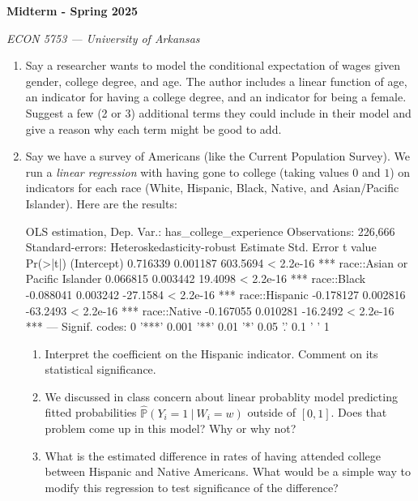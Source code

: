 \documentclass[12pt]{article}
\begin{document}
\begin{center}
  {\Huge\bf Midterm - Spring 2025}

  \smallskip
  {\large\it ECON 5753 — University of Arkansas}
\end{center}

\medskip
\begin{enumerate}
  \item Say a researcher wants to model the conditional expectation of wages given gender, college degree, and age. The author includes a linear function of age, an indicator for having a college degree, and an indicator for being a female. Suggest a few (2 or 3) additional terms they could include in their model and give a reason why each term might be good to add.

  \bigskip
  \item Say we have a survey of Americans (like the Current Population Survey). We run a \emph{linear regression} with having gone to college (taking values $0$ and $1$) on indicators for each race (White, Hispanic, Black, Native, and Asian/Pacific Islander). Here are the results:
  \begin{codeblock}[{}]
OLS estimation, Dep. Var.: has_college_experience
Observations: 226,666
Standard-errors: Heteroskedasticity-robust
                                 Estimate Std. Error  t value  Pr(>|t|)
(Intercept)                      0.716339   0.001187 603.5694 < 2.2e-16 ***
race::Asian or Pacific Islander  0.066815   0.003442  19.4098 < 2.2e-16 ***
race::Black                     -0.088041   0.003242 -27.1584 < 2.2e-16 ***
race::Hispanic                  -0.178127   0.002816 -63.2493 < 2.2e-16 ***
race::Native                    -0.167055   0.010281 -16.2492 < 2.2e-16 ***
---
Signif. codes:  0 '***' 0.001 '**' 0.01 '*' 0.05 '.' 0.1 ' ' 1
  \end{codeblock}

  \begin{enumerate}
    \item Interpret the coefficient on the Hispanic indicator. Comment on its statistical significance.

    \item We discussed in class concern about linear probablity model predicting fitted probabilities $\hat{\mathbb{P}}( Y_i = 1 \ | \ W_i = w )$ outside of $[0, 1]$. Does that problem come up in this model? Why or why not?

    \item What is the estimated difference in rates of having attended college between Hispanic and Native Americans. What would be a simple way to modify this regression to test significance of the difference?
  \end{enumerate}


\end{enumerate}
\end{document}
